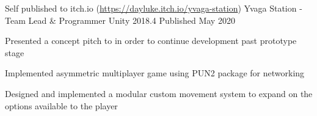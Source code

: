 \begin{cventries}
    \cventry
    {Self published to itch.io (\href{https://dayluke.itch.io/yvaga-station}{https://dayluke.itch.io/yvaga-station})}
    {Yvaga Station - Team Lead \& Programmer}
    {Unity 2018.4}
    {Published May 2020}
    {
        \begin{cvitems}
            \item Presented a concept pitch to in order to continue development past prototype stage
            \item Implemented asymmetric multiplayer game using PUN2 package for networking
            \item Designed and implemented a modular custom movement system to expand on the options available to the player
        \end{cvitems}
    }
\end{cventries}